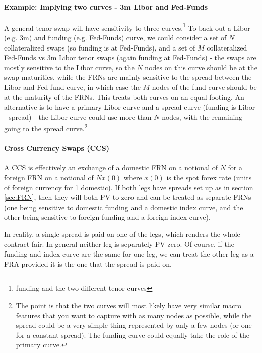 \paragraph*{Example: Implying two curves - 3m Libor and Fed-Funds}  
A general tenor swap will have sensitivity to three curves.\footnote{funding and the two different tenor curves} To back out a Libor (e.g. 3m) and funding (e.g. Fed-Funds) curve, we could consider a set of $N$ collateralized swaps (so funding is at Fed-Funds), and a set of $M$ collateralized  Fed-Funds vs 3m Libor tenor swaps (again funding at Fed-Funds) - the swaps are mostly sensitive to the Libor curve, so the $N$ nodes on this curve should be at the swap maturities, while the FRNs are mainly sensitive to the spread between the Libor and Fed-fund curve, in which case the $M$ nodes of the fund curve should be at the maturity of the FRNs. This treats both curves on an equal footing. An alternative is to have a primary Libor curve and a spread curve (funding is Libor - spread) - the Libor curve could use more than $N$ nodes, with the remaining going to the spread curve.\footnote{The point is that the two curves will most likely have very similar macro features that you want to capture with as many nodes as possible, while the spread could be a very simple thing represented by only a few nodes (or one for a constant spread).  The funding curve could equally take the role of the primary curve.}

\paragraph{Cross Currency Swaps (CCS)}
A CCS is effectively an exchange of a domestic FRN on a notional of $N$ for a foreign FRN on a notional of $Nx(0)$ where $x(0)$ is the spot forex rate (units of foreign currency for 1 domestic). If both legs have spreads set up as in section \ref{sec:FRN}, then they will both PV to zero and can be treated as separate FRNs (one being sensitive to domestic funding and a domestic index curve, and the other being sensitive to foreign funding and a foreign index curve).

In reality, a single spread is paid on one of the legs, which renders the whole contract fair. In general neither leg is separately PV zero. Of course, if the funding and index curve are the same for one leg, we can treat the other leg as a FRA provided it is the one that the spread is paid on.

